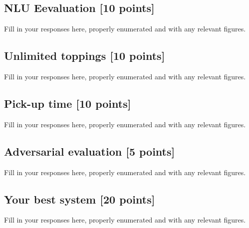 \documentclass{article}
\begin{document}
	\subsection{NLU Eevaluation [10 points]}

	Fill in your responses here, properly enumerated and with any relevant figures.

	\subsection{Unlimited toppings [10 points]}

	Fill in your responses here, properly enumerated and with any relevant figures.

	\subsection{Pick-up time [10 points]}

	Fill in your responses here, properly enumerated and with any relevant figures.

	\subsection{Adversarial evaluation [5 points]}

	Fill in your responses here, properly enumerated and with any relevant figures.

	\subsection{Your best system [20 points]}

	Fill in your responses here, properly enumerated and with any relevant figures.
\end{document}
